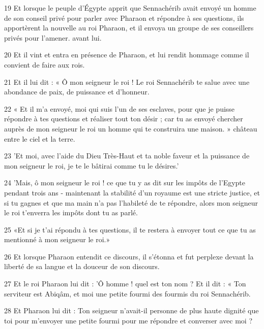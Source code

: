\par 19 Et lorsque le peuple d'Égypte apprit que Sennachérib avait envoyé un homme de son conseil privé pour parler avec Pharaon et répondre à ses questions, ils apportèrent la nouvelle au roi Pharaon, et il envoya un groupe de ses conseillers privés pour l'amener. avant lui.

\par 20 Et il vint et entra en présence de Pharaon, et lui rendit hommage comme il convient de faire aux rois.

\par 21 Et il lui dit : « Ô mon seigneur le roi ! Le roi Sennachérib te salue avec une abondance de paix, de puissance et d'honneur.

\par 22 « Et il m'a envoyé, moi qui suis l'un de ses esclaves, pour que je puisse répondre à tes questions et réaliser tout ton désir ; car tu as envoyé chercher auprès de mon seigneur le roi un homme qui te construira une maison. » château entre le ciel et la terre.

\par 23 'Et moi, avec l'aide du Dieu Très-Haut et ta noble faveur et la puissance de mon seigneur le roi, je te le bâtirai comme tu le désires.'

\par 24 'Mais, ô mon seigneur le roi ! ce que tu y as dit sur les impôts de l'Egypte pendant trois ans - maintenant la stabilité d'un royaume est une stricte justice, et si tu gagnes et que ma main n'a pas l'habileté de te répondre, alors mon seigneur le roi t'enverra les impôts dont tu as parlé.

\par 25 «Et si je t'ai répondu à tes questions, il te restera à envoyer tout ce que tu as mentionné à mon seigneur le roi.»

\par 26 Et lorsque Pharaon entendit ce discours, il s'étonna et fut perplexe devant la liberté de sa langue et la douceur de son discours.

\par 27 Et le roi Pharaon lui dit : 'Ô homme ! quel est ton nom ? Et il dit : « Ton serviteur est Abiqâm, et moi une petite fourmi des fourmis du roi Sennachérib.

\par 28 Et Pharaon lui dit : Ton seigneur n'avait-il personne de plus haute dignité que toi pour m'envoyer une petite fourmi pour me répondre et converser avec moi ?

